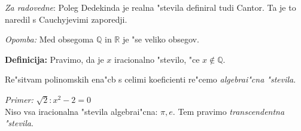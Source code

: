 \emph{Za radovedne}: Poleg Dedekinda je realna "stevila definiral tudi Cantor. Ta je to naredil s Cauchyjevimi zaporedji.

\emph{Opomba:} Med obsegoma $\mathbb{Q}$ in $\mathbb{R}$ je "se veliko obsegov.

\textbf{Definicija:} Pravimo, da je $x$ iracionalno "stevilo, "ce $x \notin \mathbb{Q}$.

Re"sitvam polinomskih ena"cb s celimi koeficienti re"cemo \emph{algebrai"cna "stevila}.

\emph{Primer:} $\sqrt{2}: x^2 -2 =0$\\

Niso vsa iracionalna "stevila algebrai"cna: $\pi, e$. Tem pravimo \emph{transcendentna "stevila}.
